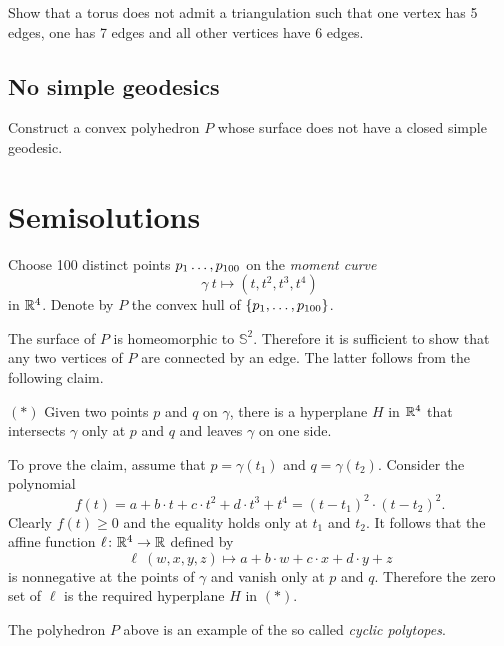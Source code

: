 \begin{pr}
Show that a torus does not admit a triangulation 
such that one vertex has 5 edges,
one has 7 edges and 
all other vertices have 
6 edges. 
\end{pr}


\subsection*{No simple geodesics\easy}\label{No simple geodesics}

\begin{pr}
Construct a convex polyhedron $P$ whose surface 
does not have a closed simple geodesic.
\end{pr}

\section*{Semisolutions}


Choose 100 distinct points $p_1\z\dots,p_{100}$
on the {}\emph{moment curve} 
\[\gamma\:t\mapsto (t,t^2,t^3,t^4)\] 
in $\mathbb{R}^4$.
Denote by $P$ the convex hull of $\{p_1,\z\dots,p_{100}\}$.

The surface of $P$ is homeomorphic to $\mathbb{S}^2$.
Therefore it is sufficient to show that any two vertices of $P$ are connected by an edge.
The latter follows from the following claim.

\begin{cl}{$({*})$}
Given two points $p$ and $q$ on $\gamma$, there is a hyperplane $H$ in $\mathbb{R}^4$ that intersects $\gamma$ only at $p$ and $q$ and leaves $\gamma$ on one side.
\end{cl}

To prove the claim, assume that $p=\gamma(t_1)$ and $q=\gamma(t_2)$. 
Consider the polynomial
\[f(t)=a+b\cdot t+c\cdot t^2+d\cdot t^3+t^4=(t-t_1)^2\cdot(t-t_2)^2.\]
Clearly $f(t)\ge 0$ and the equality holds only at $t_1$ and $t_2$.
It follows that the affine function $\ell\colon\mathbb{R}^4\to\mathbb{R}$ defined by 
\[\ell\:(w,x,y,z)\mapsto a+b\cdot w+c\cdot x+d\cdot y+z\]
is nonnegative at the points of $\gamma$ and vanish only at $p$ and $q$.
Therefore the zero set of $\ell$ is the required hyperplane $H$ in $({*})$. 
\qeds

The polyhedron $P$ above is an example of the so called \emph{cyclic polytopes}.

